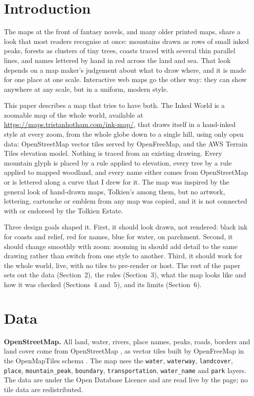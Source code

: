 \documentclass[11pt,a4paper]{article}
\begin{document}
\section{Introduction}
The maps at the front of fantasy novels, and many older printed maps, share a look that most readers recognise at once: mountains drawn as rows of small inked peaks, forests as clusters of tiny trees, coasts traced with several thin parallel lines, and names lettered by hand in red across the land and sea. That look depends on a map maker's judgement about what to draw where, and it is made for one place at one scale. Interactive web maps go the other way: they can show anywhere at any scale, but in a uniform, modern style.

This paper describes a map that tries to have both. The Inked World is a zoomable map of the whole world, available at \url{https://maps.tristanhotham.com/ink-map/}, that draws itself in a hand-inked style at every zoom, from the whole globe down to a single hill, using only open data: OpenStreetMap vector tiles served by OpenFreeMap, and the AWS Terrain Tiles elevation model. Nothing is traced from an existing drawing. Every mountain glyph is placed by a rule applied to elevation, every tree by a rule applied to mapped woodland, and every name either comes from OpenStreetMap or is lettered along a curve that I drew for it. The map was inspired by the general look of hand-drawn maps, Tolkien's among them, but no artwork, lettering, cartouche or emblem from any map was copied, and it is not connected with or endorsed by the Tolkien Estate.

Three design goals shaped it. First, it should look drawn, not rendered: black ink for coasts and relief, red for names, blue for water, on parchment. Second, it should change smoothly with zoom: zooming in should add detail to the same drawing rather than switch from one style to another. Third, it should work for the whole world, live, with no tiles to pre-render or host. The rest of the paper sets out the data (Section~2), the rules (Section~3), what the map looks like and how it was checked (Sections~4 and~5), and its limits (Section~6).

\section{Data}
\textbf{OpenStreetMap.} All land, water, rivers, place names, peaks, roads, borders and land cover come from OpenStreetMap \citep{osm}, as vector tiles built by OpenFreeMap \citep{openfreemap} in the OpenMapTiles schema \citep{openmaptiles}. The map uses the \texttt{water}, \texttt{waterway}, \texttt{landcover}, \texttt{place}, \texttt{mountain\_peak}, \texttt{boundary}, \texttt{transportation}, \texttt{water\_name} and \texttt{park} layers. The data are under the Open Database Licence and are read live by the page; no tile data are redistributed.
\end{document}
